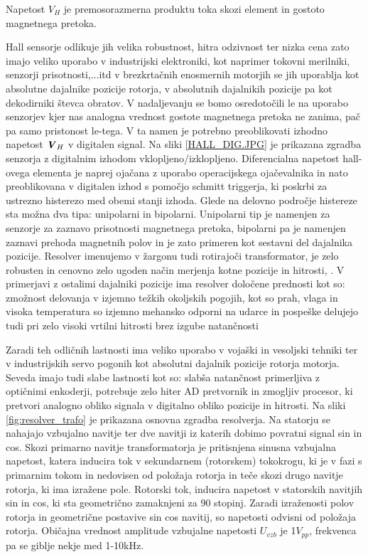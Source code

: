 \documentclass[a4paper,twoside,openright,12pt]{book}
\begin{document}
Napetost $V_H$ je premosorazmerna produktu toka skozi element in gostoto magnetnega pretoka.

Hall sensorje odlikuje jih velika robustnost, hitra odzivnost ter nizka cena zato imajo veliko uporabo v industrijski elektroniki, kot naprimer tokovni merilniki, senzorji prisotnosti,...itd v brezkrtačnih enosmernih motorjih se jih uporablja kot absolutne dajalnike pozicije rotorja, v absolutnih dajalnikih pozicije pa kot dekodirniki števca obratov. V nadaljevanju se bomo osredotočili le na uporabo senzorjev kjer nas analogna vrednost gostote magnetnega pretoka ne zanima, pač pa samo pristonost le-tega. V ta namen je potrebno preoblikovati  izhodno napetost  $\textbf{\textit{V}}_H$ v digitalen signal.
Na sliki \ref{HALL_DIG.JPG} je prikazana zgradba senzorja z digitalnim izhodom vklopljeno/izklopljeno. Diferencialna napetost hall-ovega elementa je naprej ojačana z uporabo operacijskega ojačevalnika in nato preoblikovana v digitalen izhod s pomočjo schmitt triggerja, ki poskrbi za ustrezno histerezo med obemi stanji izhoda.  Glede na delovno področje histereze sta možna dva tipa: unipolarni in bipolarni. 
Unipolarni tip je namenjen za senzorje za zaznavo prisotnosti magnetnega pretoka, bipolarni pa je namenjen zaznavi prehoda magnetnih polov in je zato primeren kot sestavni del dajalnika pozicije.
Resolver imenujemo v žargonu tudi rotirajoči transformator, je zelo robusten in cenovno zelo ugoden način merjenja kotne pozicije in hitrosti, . V primerjavi z ostalimi dajalniki pozicije ima resolver določene prednosti kot so: 
 zmožnost delovanja v izjemno težkih okoljskih pogojih, kot so prah, vlaga in visoka temperatura  
 so izjemno mehansko odporni na udarce in pospeške 
 delujejo tudi pri zelo visoki vrtilni hitrosti brez izgube natančnosti   

Zaradi teh odličnih lastnosti ima veliko uporabo v vojaški in vesoljski tehniki ter v industrijskih servo pogonih kot absolutni dajalnik pozicije rotorja motorja. Seveda imajo tudi slabe lastnosti kot so: slabša natančnost primerljiva z optičnimi enkoderji, potrebuje zelo hiter AD pretvornik in zmogljiv procesor, ki pretvori analogno obliko signala v digitalno obliko pozicije in hitrosti.
Na sliki \ref{fig:resolver_trafo} je prikazana osnovna zgradba resolverja. Na statorju se nahajajo vzbujalno navitje ter dve navitji iz katerih dobimo povratni signal sin in cos. Skozi primarno navitje transformatorja je pritisnjena sinusna vzbujalna napetost, katera inducira tok v sekundarnem (rotorskem) tokokrogu, ki je v fazi s primarnim tokom in nedovisen od položaja rotorja in teče skozi drugo navitje rotorja, ki ima izražene pole. Rotorski tok, inducira napetost  v statorskih navitjih sin in cos, ki sta geometrično zamaknjeni za 90 stopinj. Zaradi izraženosti polov rotorja in geometrične postavive sin cos navitij, so napetosti odvisni od položaja rotorja. Običajna vrednost amplitude vzbujalne napetosti $U_{vzb}$ je 1$V_{pp}$, frekvenca pa se giblje nekje med 1-10kHz.
\end{document}
